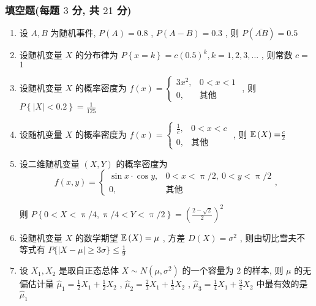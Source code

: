 \subsubsection{填空题(每题 $3$ 分, 共 $21$ 分)}
\begin{enumerate}
	\item 设 $A,B$ 为随机事件, $P(A)=0.8$ , $P(A-B)=0.3$ , 则 $P\left(\overline{AB}\right)=$\underline{\hspace{1pc}$0.5$\hspace{1pc}}
	
	\item 设随机变量 $X$ 的分布律为 $P\left\{x=k\right\}=c(0.5)^k,k=1,2,3,\ldots$ , 则常数 $c=$\underline{\hspace{1pc}$1$\hspace{1pc}}
	
	\item 设随机变量 $X$ 的概率密度为 $f(x)=
	\begin{cases}
	3x^2, & 0<x<1\\
	0, & \text{其他}
	\end{cases}
	$ , 则 $P\left\{\left|X\right|<0.2\right\}=$\underline{\hspace{1pc}$\frac{1}{125}$\hspace{1pc}}
	
	\item 设随机变量 $X$ 的概率密度为 $f(x)=
	\begin{cases}
	\frac{1}{c}, & 0<x<c\\
	0, & \text{其他}
	\end{cases}
	$ , 则 $\mathbb{E}\,(X)=$\underline{\hspace{1pc}$\frac{c}{2}$\hspace{1pc}}
	
	\item 设二维随机变量 $(X,Y)$ 的概率密度为
	\begin{equation*}
	f(x,y)=
	\begin{cases}
	\sin x\cdot\cos y, & 0<x<\uppi/2,\ 0<y<\uppi/2\\
	0, & \text{其他}
	\end{cases}
	,
	\end{equation*}
	
	则 $P\left\{0<X<\uppi/4,\uppi/4<Y<\uppi/2\right\}=$\underline{\hspace{1pc}$\left( \frac{2-\sqrt{2}}{2} \right)^2$\hspace{1pc}}
	
	\item 设随机变量 $X$ 的数学期望 $\mathbb{E}\,(X)=\mu$ , 方差 $D(X)=\sigma^2$ , 则由切比雪夫不等式有 $P\{|X-\mu|\geq3\sigma\}\leq$\underline{\hspace{1pc}$\frac{1}{9}$\hspace{1pc}}
	
	\item 设 $X_1,X_2$ 是取自正态总体 $X\sim N\left(\mu,\sigma^2\right)$ 的一个容量为 $2$ 的样本, 则 $\mu$ 的无偏估计量 $\hat\mu_1=\frac{1}{2}X_1+\frac{1}{2}X_2$ , $\hat\mu_2=\frac{2}{3}X_1+\frac{1}{3}X_2$ , $\hat\mu_3=\frac{1}{4}X_1+\frac{3}{4}X_2$ 中最有效的是\underline{\hspace{1pc}$\hat\mu_1$\hspace{1pc}}
\end{enumerate}

